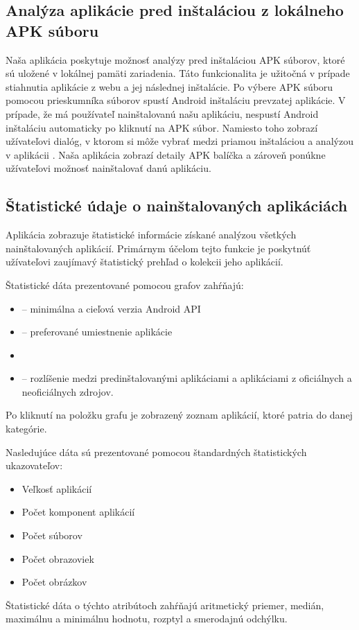 \subsection{Analýza aplikácie pred inštaláciou z lokálneho APK súboru}
Naša aplikácia poskytuje možnosť analýzy pred inštaláciou APK súborov, ktoré sú uložené v lokálnej pamäti zariadenia. Táto funkcionalita je užitočná v prípade stiahnutia aplikácie z webu a jej následnej inštalácie. Po výbere APK súboru pomocou prieskumníka súborov spustí Android inštaláciu prevzatej aplikácie. V prípade, že má používateľ nainštalovanú našu aplikáciu, nespustí Android inštaláciu automaticky po kliknutí na APK súbor. Namiesto toho zobrazí užívateľovi dialóg, v ktorom si môže vybrať medzi priamou inštaláciou a analýzou v aplikácii . Naša aplikácia zobrazí detaily APK balíčka a zároveň ponúkne užívateľovi možnosť nainštalovať danú aplikáciu.

\subsection{Štatistické údaje o nainštalovaných aplikáciách}
Aplikácia zobrazuje štatistické informácie získané analýzou všetkých nainštalovaných aplikácií. Primárnym účelom tejto funkcie je poskytnúť užívateľovi zaujímavý štatistický prehľad o kolekcii jeho aplikácií. 

\noindent Štatistické dáta prezentované pomocou grafov zahŕňajú:
\begin{itemize}
	\item {} -- minimálna a cieľová verzia Android API
	\item {} -- preferované umiestnenie aplikácie
	\item {}
	\item {} -- rozlíšenie medzi predinštalovanými aplikáciami a aplikáciami z oficiálnych a neoficiálnych zdrojov. 
\end{itemize}
\noindent Po kliknutí na položku grafu je zobrazený zoznam aplikácií, ktoré patria do danej kategórie.

\noindent Nasledujúce dáta sú prezentované pomocou štandardných štatistických ukazovateľov:
\begin{itemize}
	\item Veľkosť aplikácií
	\item Počet komponent aplikácií
	\item Počet súborov
	\item Počet obrazoviek
	\item Počet obrázkov
\end{itemize}
Štatistické dáta o týchto atribútoch zahŕňajú aritmetický priemer, medián, maximálnu a minimálnu hodnotu, rozptyl a smerodajnú odchýlku. 

